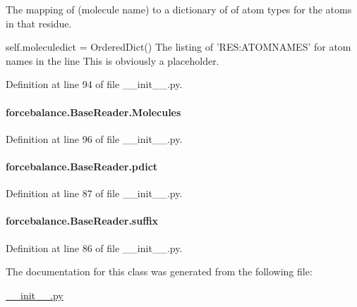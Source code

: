 The mapping of (molecule name) to a dictionary of of atom types for the atoms in that residue. 

self.\-moleculedict = Ordered\-Dict() The listing of 'R\-E\-S\-:A\-T\-O\-M\-N\-A\-M\-E\-S' for atom names in the line This is obviously a placeholder. 

Definition at line 94 of file \-\_\-\-\_\-init\-\_\-\-\_\-.\-py.

\hypertarget{classforcebalance_1_1BaseReader_a4369b5fb663a83b11602daa71db6862e}{
\paragraph[{Molecules}]{\setlength{\rightskip}{0pt plus 5cm}forcebalance.\-Base\-Reader.\-Molecules}}\label{classforcebalance_1_1BaseReader_a4369b5fb663a83b11602daa71db6862e}


Definition at line 96 of file \-\_\-\-\_\-init\-\_\-\-\_\-.\-py.

\hypertarget{classforcebalance_1_1BaseReader_aaf18c900d6055ed4b5124f6bb26164c1}{
\paragraph[{pdict}]{\setlength{\rightskip}{0pt plus 5cm}forcebalance.\-Base\-Reader.\-pdict}}\label{classforcebalance_1_1BaseReader_aaf18c900d6055ed4b5124f6bb26164c1}


Definition at line 87 of file \-\_\-\-\_\-init\-\_\-\-\_\-.\-py.

\hypertarget{classforcebalance_1_1BaseReader_a48ef0584a1b6b4b6f8eb741ad8465db8}{
\paragraph[{suffix}]{\setlength{\rightskip}{0pt plus 5cm}forcebalance.\-Base\-Reader.\-suffix}}\label{classforcebalance_1_1BaseReader_a48ef0584a1b6b4b6f8eb741ad8465db8}


Definition at line 86 of file \-\_\-\-\_\-init\-\_\-\-\_\-.\-py.



The documentation for this class was generated from the following file\-:\begin{DoxyCompactItemize}
\item 
\hyperlink{____init_____8py}{\-\_\-\-\_\-init\-\_\-\-\_\-.\-py}\end{DoxyCompactItemize}
